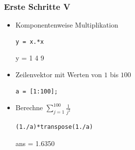 \documentclass[hyperref={xetex}]{beamer}
\begin{document}
\begin{frame}[fragile]\frametitle{Erste Schritte V}
\begin{itemize}
\item Komponentenweise Multiplikation
\begin{lstlisting}
y = x.*x
\end{lstlisting}
\begin{matlab}
 y =
     1     4     9 
\end{matlab}

\item Zeilenvektor mit Werten von $1$ bis $100$
\begin{lstlisting}
a = [1:100];
\end{lstlisting}
\item Berechne $\sum_{j=1}^{100} \frac{1}{j^2}$
\begin{lstlisting}
(1./a)*transpose(1./a)
\end{lstlisting}
\begin{matlab}
ans = 1.6350 
\end{matlab}
\end{itemize}
\end{frame}
\end{document}
